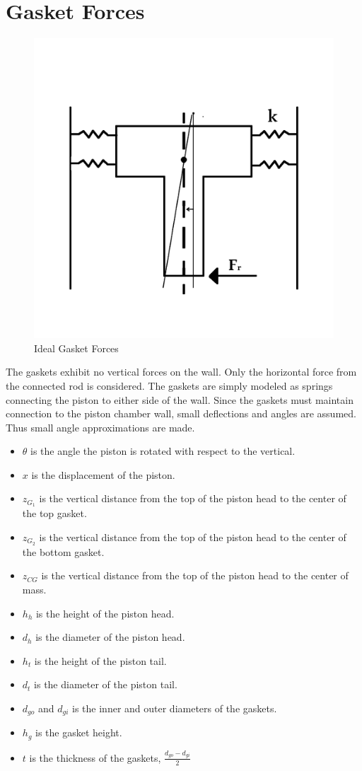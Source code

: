 \documentclass[10pt,a4paper]{article}
\begin{document}
\section*{Gasket Forces}
	\begin{figure}[h]
		\centering
		\includegraphics[width=.75\textwidth]{PistonDiagram.png}
		\caption{Ideal Gasket Forces}
		\label{fig:diagram1}
	\end{figure}
	The gaskets exhibit no vertical forces on the wall. Only the horizontal force from the connected rod is considered.
	The gaskets are simply modeled as springs connecting the piston to either side of the wall. Since the gaskets must maintain connection to the piston chamber wall, small deflections and angles are assumed. Thus small angle approximations are made.
	\begin{itemize}
	\item $\theta$ is the angle the piston is rotated with respect to the vertical.
	\item $x$ is the displacement of the piston.
	\item $z_{G_1}$ is the vertical distance from the top of the piston head to the center of the top gasket.
	\item $z_{G_2}$ is the vertical distance from the top of the piston head to the center of the bottom gasket.
	\item $z_{CG}$ is the vertical distance from the top of the piston head to the center of mass.
	\item $h_h$ is the height of the piston head.
	\item $d_h$ is the diameter of the piston head.
	\item $h_t$ is the height of the piston tail.
	\item $d_t$ is the diameter of the piston tail.
	\item $d_{go}$ and $d_{gi}$ is the inner and outer diameters of the gaskets.
	\item $h_g$ is the gasket height.
	\item $t$ is the thickness of the gaskets, $\frac{d_{go}-d_{gi}}{2} $
	\end{itemize}
\end{document}

